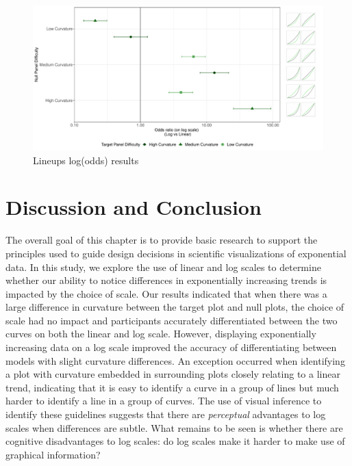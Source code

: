 \documentclass[print]{nuthesis}
\begin{document}
\begin{figure}[tbp]

{\centering \includegraphics[width=\linewidth,]{thesis_files/figure-latex/odds-ratio-plot-1} 

}

\caption{Lineups log(odds) results}\label{fig:odds-ratio-plot}
\end{figure}

\hypertarget{discussion-and-conclusion}{%
\section{Discussion and Conclusion}\label{discussion-and-conclusion}}

The overall goal of this chapter is to provide basic research to support the principles used to guide design decisions in scientific visualizations of exponential data.
In this study, we explore the use of linear and log scales to determine whether our ability to notice differences in exponentially increasing trends is impacted by the choice of scale.
Our results indicated that when there was a large difference in curvature between the target plot and null plots, the choice of scale had no impact and participants accurately differentiated between the two curves on both the linear and log scale.
However, displaying exponentially increasing data on a log scale improved the accuracy of differentiating between models with slight curvature differences.
An exception occurred when identifying a plot with curvature embedded in surrounding plots closely relating to a linear trend, indicating that it is easy to identify a curve in a group of lines but much harder to identify a line in a group of curves.
The use of visual inference to identify these guidelines suggests that there are \emph{perceptual} advantages to log scales when differences are subtle.
What remains to be seen is whether there are cognitive disadvantages to log scales: do log scales make it harder to make use of graphical information?
\end{document}
